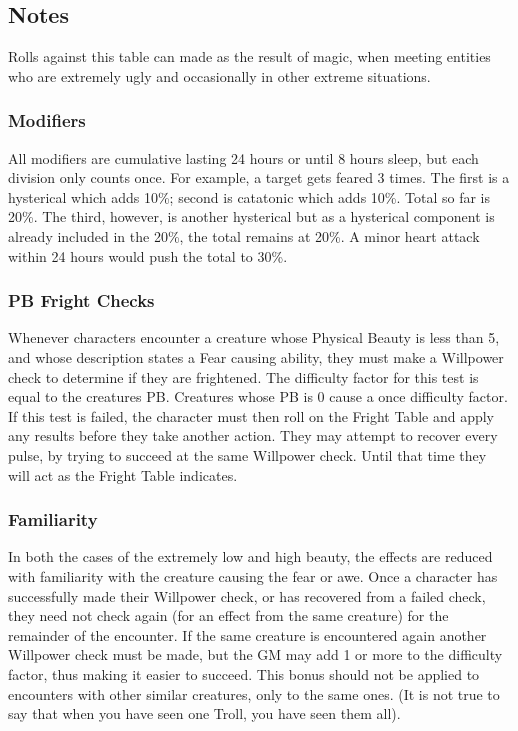 \begin{multicols}{3}

\subsection{Notes}

Rolls against this table can made as the result of magic, when meeting
entities who are extremely ugly and occasionally in other extreme
situations.

\subsubsection{Modifiers}

All modifiers are cumulative lasting 24 hours or until 8 hours sleep,
but each division only counts once.  For example, a target gets feared
3 times.  The first is a hysterical which adds 10\%; second is
catatonic which adds 10\%.  Total so far is 20\%.  The third, however,
is another hysterical but as a hysterical component is already
included in the 20\%, the total remains at 20\%.  A minor heart attack
within 24 hours would push the total to 30\%.

\subsubsection{PB Fright Checks}

Whenever characters encounter a creature whose Physical Beauty is less
than 5, and whose description states a Fear causing ability, they must
make a Willpower check to determine if they are frightened. The
difficulty factor for this test is equal to the creatures
PB. Creatures whose PB is 0 cause a once difficulty factor.  If this
test is failed, the character must then roll on the Fright Table and
apply any results before they take another action.  They may attempt
to recover every pulse, by trying to succeed at the same Willpower
check.  Until that time they will act as the Fright Table indicates.

\subsubsection{Familiarity}

In both the cases of the extremely low and high beauty, the effects
are reduced with familiarity with the creature causing the fear or
awe.  Once a character has successfully made their Willpower check, or
has recovered from a failed check, they need not check again (for an
effect from the same creature) for the remainder of the encounter.  If
the same creature is encountered again another Willpower check must be
made, but the GM may add 1 or more to the difficulty factor, thus
making it easier to succeed.  This bonus should not be applied to
encounters with other similar creatures, only to the same ones. (It is
not true to say that when you have seen one Troll, you have seen them
all).



\end{multicols}
